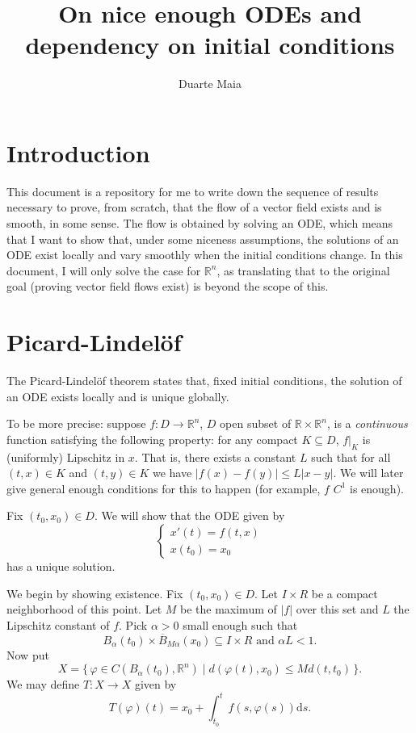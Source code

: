 \documentclass{article}
\title{On nice enough ODEs and dependency on initial conditions}
\author{Duarte Maia}
\date{}
\newcommand{\R}{\mathbb{R}}
\newcommand{\dd}{\mathrm{d}}
\begin{document}
\maketitle

\section{Introduction}

This document is a repository for me to write down the sequence of results necessary to prove, from scratch, that the flow of a vector field exists and is smooth, in some sense. The flow is obtained by solving an ODE, which means that I want to show that, under some niceness assumptions, the solutions of an ODE exist locally and vary smoothly when the initial conditions change. In this document, I will only solve the case for $\R^n$, as translating that to the original goal (proving vector field flows exist) is beyond the scope of this.

\section{Picard-Lindelöf}

The Picard-Lindelöf theorem states that, fixed initial conditions, the solution of an ODE exists locally and is unique globally.

To be more precise: suppose $f : D \to \R^n$, $D$ open subset of $\R \times \R^n$, is a \emph{continuous} function satisfying the following property: for any compact $K \subseteq D$, $f|_K$ is (uniformly) Lipschitz in $x$. That is, there exists a constant $L$ such that for all $(t,x) \in K$ and $(t, y) \in K$ we have $\lvert f(x) - f(y) \rvert \leq L \lvert x - y \rvert$. We will later give general enough conditions for this to happen (for example, $f$ $C^1$ is enough).

Fix $(t_0, x_0) \in D$. We will show that the ODE given by
\begin{equation}\label{ode}
\begin{cases}
x'(t) = f(t, x)\\
x(t_0) = x_0
\end{cases}
\end{equation}
has a unique solution.

We begin by showing existence. Fix $(t_0, x_0) \in D$. Let $I \times R$ be a compact neighborhood of this point. Let $M$ be the maximum of $\lvert f \rvert$ over this set and $L$ the Lipschitz constant of $f$. Pick $\alpha > 0$ small enough such that
\[B_\alpha(t_0) \times \overline B_{M \alpha}(x_0) \subseteq I \times R \text{ and } \alpha L < 1.\]
Now put
\[X = \{\, \varphi \in C(B_\alpha(t_0), \R^n) \mid d(\varphi(t), x_0) \leq M d(t, t_0)\,\}.\]
We may define $T : X \to X$ given by
\[T(\varphi)(t) = x_0 + \int_{t_0}^t f(s, \varphi(s)) \dd s.\]
\end{document}
